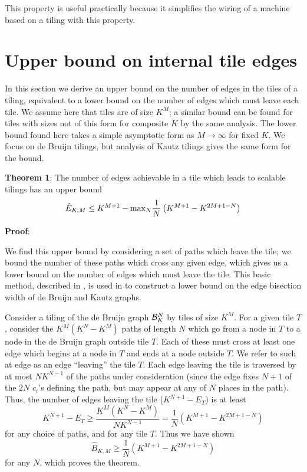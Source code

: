 \documentclass[12pt]{article}
\begin{document}
This property is useful practically because it simplifies the wiring
of a machine based on a tiling with this property.  

\section{Upper bound on internal tile edges}
\label{sec:asymptotic}

In this section we derive an upper bound on the number of edges in the
tiles of a tiling, equivalent to a lower bound on the number of edges
which must leave each tile.  We assume here that tiles are of size $K^M$; a
similar bound can be found for tiles with sizes not of this form for
composite $K$ by the same analysis.  The lower bound found here takes a simple
asymptotic form as $M \rightarrow \infty$ for fixed $K$.  We focus on
de Bruijn tilings, but analysis of Kautz tilings gives the same form
for the bound.


\vspace*{0.1in}
\noindent
{\bf Theorem 1}: The number of edges achievable in a tile which
leads to scalable tilings has an upper bound
\begin{equation}
\hat{E}_{K, M} \leq K^{M + 1} -
{\rm max}_{N}  \frac{1}{N} \left( K^{M + 1} -K^{2M + 1-N} \right)
\end{equation}

\vspace*{0.1in}
\noindent
{\bf Proof}:

We find this upper bound by considering a set of paths which leave the
tile; we bound the number of these paths which cross any given edge,
which gives us a lower bound on the number of edges which must leave
the tile.  This basic method, described in \cite{Leighton}, is used in
\cite{rttv} to construct a lower bound on the edge bisection width of
de Bruijn and Kautz graphs.


Consider a tiling of the de Bruijn graph ${\cal B}_K^N$ by tiles of
size $K^M$.  For a given tile $T$, consider the $K^M (K^N -K^M)$ paths
of length $N$ which go from a node in $T$ to a node in the de Bruijn
graph outside tile $T$.  Each of these must cross at least one edge
which begins at a node in $T$ and ends at a node outside $T$.  We
refer to such at edge as an edge ``leaving'' the tile $T$.  Each edge
leaving the tile is traversed by at most $N K^{N -1}$ of the paths
under consideration (since the edge fixes $N + 1$ of the $2 N$ $c_i$'s
defining the path, but may appear at any of $N$ places in the path).
Thus, the number of edges leaving the tile ($K^{N + 1}-E_T$) is at
least
\begin{equation}
K^{N + 1}-E_T\geq \frac{K^M(K^N -K^M)}{N K^{N -1}} 
= \frac{1}{N} \left( K^{M + 1} -K^{2M + 1-N} \right)
\label{eq:e-bound}
\end{equation}
for any choice of paths, and for any tile $T$.
Thus we have shown
\begin{equation}
\hat{B}_{K, M} \geq \frac{1}{N} \left( K^{M + 1} -K^{2M + 1-N} \right)
\label{eq:b-bound}
\end{equation}
for any $N$,
which proves the theorem.
\vspace*{0.1in}
\end{document}
